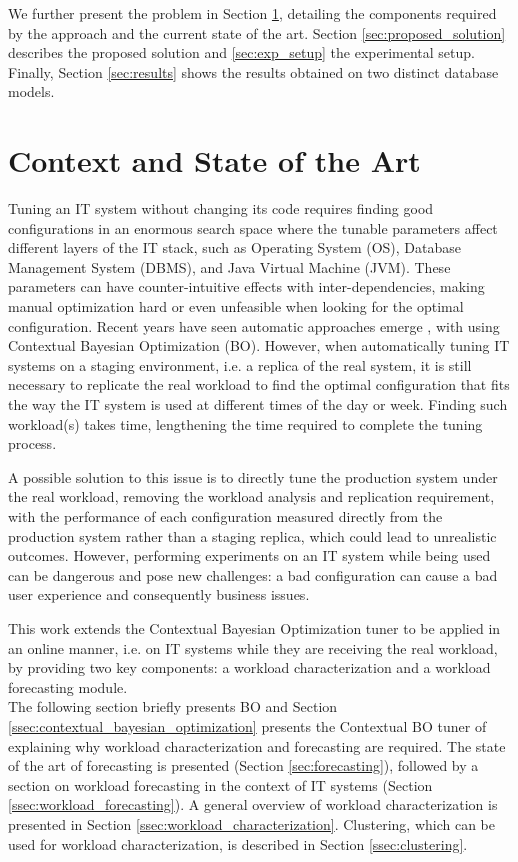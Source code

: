 \documentclass[a4paper, 12pt]{article} %
\begin{document}
	We further present the problem in Section \ref{sec:context_and_state_of_the_art}, detailing the components required by the approach and the current state of the art. Section \ref{sec:proposed_solution} describes the proposed solution and \ref{sec:exp_setup} the experimental setup. Finally, Section \ref{sec:results} shows the results obtained on two distinct database models.
	
	\section{Context and State of the Art } \label{sec:context_and_state_of_the_art}
	Tuning an IT system without changing its code requires finding good configurations in an enormous search space where the tunable parameters affect different layers of the IT stack, such as Operating System (OS), Database Management System (DBMS), and Java Virtual Machine (JVM). These parameters can have counter-intuitive effects with inter-dependencies, making manual optimization hard or even unfeasible when looking for the optimal configuration. Recent years have seen automatic approaches emerge \cite{AkamasCGP, OtterTune, OtterTune2, LearningToSample}, with \cite{AkamasCGP} using Contextual Bayesian Optimization (BO). However, when automatically tuning IT systems on a staging environment, i.e. a replica of the real system, it is still necessary to replicate the real workload to find the optimal configuration that fits the way the IT system is used at different times of the day or week. Finding such workload(s) takes time, lengthening the time required to complete the tuning process.
	
	A possible solution to this issue is to directly tune the production system under the real workload, removing the workload analysis and replication requirement, with the performance of each configuration measured directly from the production system rather than a staging replica, which could lead to unrealistic outcomes. However, performing experiments on an IT system while being used can be dangerous and pose new challenges: a bad configuration can cause a bad user experience and consequently business issues.
	
	This work extends the Contextual Bayesian Optimization tuner \cite{AkamasCGP} to be applied in an online manner, i.e. on IT systems while they are receiving the real workload, by providing two key components: a workload characterization and a workload forecasting module. \\
	The following section briefly presents BO and Section \ref{ssec:contextual_bayesian_optimization} presents the Contextual BO tuner of \cite{AkamasCGP} explaining why workload characterization and forecasting are required. The state of the art of forecasting is presented (Section \ref{sec:forecasting}), followed by a section on workload forecasting in the context of IT systems (Section \ref{ssec:workload_forecasting}). A general overview of workload characterization is presented in Section \ref{ssec:workload_characterization}. Clustering, which can be used for workload characterization, is described in Section \ref{ssec:clustering}.
	
\end{document}
